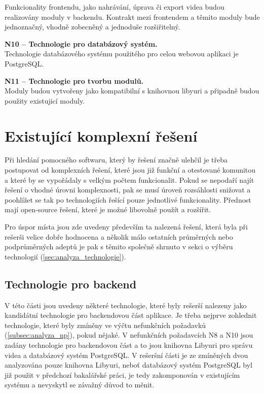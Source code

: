 \documentclass[thesis=M,czech]{FITthesis}[2012/06/26]
\begin{document}
\begin{description}
	Funkcionality frontendu, jako nahrávání, úprava či export videa budou realizovány moduly v backendu. Kontrakt mezi frontendem a těmito moduly bude jednoznačný, vhodně zobecněný a jednoduše rozšiřitelný.
    \item \textbf{N10 -- Technologie pro databázový systém.\\}
	Technologie databázového systému použitého pro celou webovou aplikaci je PostgreSQL.
    \item \textbf{N11 -- Technologie pro tvorbu modulů.\\}
	Moduly budou vytvořeny jako kompatibilní s knihovnou libyuri a připadně budou použity existujicí moduly.
  \end{description}

\section{Existující komplexní řešení} \label{sec:analyza_existujici_reseni}
Při hledání pomocného softwaru, který by řešení značně ulehčil je třeba postupovat od komplexních řešení, které jsou již funkční a otestované komunitou a které by se vypořádaly s velkým počtem funkcionalit. Pokud se nepodaří najít řešení o vhodné úrovni komplexnosti, pak se musí úroveň rozsáhlosti snižovat a poohlížet se tak po technologiích řešící pouze jednotlivé funkcionality. Přednost mají open-source řešení, které je možné libovolně použít a rozšířit.

	Pro úspor místa jsou zde uvedeny především ta nalezená řešení, která byla při rešerši velice dobře hodnocena a několik málo ostatních průměrných nebo podprůměrných adeptů je pak s těmito společně shrnuto v sekci o výběru technologií (\ref{sec:analyza_technologie}).


\subsection{Technologie pro backend} \label{subsec:analyza_reseni_backend}
V této části jsou uvedeny některé technologie, které byly rešerší nalezeny jako kandidátní technologie pro backendovou část aplikace. Je třeba nejprve zohlednit technologie, které byly zmíněny ve výčtu nefunkčních požadavků (\ref{subsec:analyza_np}), pokud nějaké. V nefunkčních požadavcích N8 a N10 jsou zadány technologie pro backendovou část a to jsou knihovna Libyuri pro správu videa a databázový systém PostgreSQL. V rešeršní části je ze zmíněných dvou analyzována pouze knihovna Libyuri, neboť databázový systém PostgreSQL byl již použit v předchozí bakalářské práci, je tedy zakomponován v existujícím systému a nevyskytl se závažný důvod to měnit.
\end{document}

